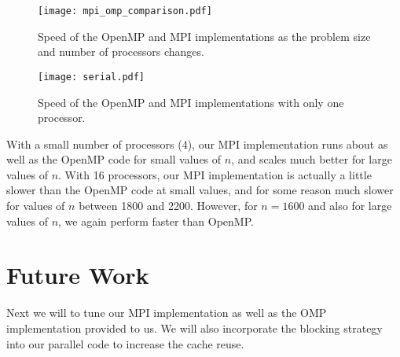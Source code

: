 \documentclass[11pt]{article}
\begin{document}
\begin{figure}[h]
	\centering
	\texttt{[image: mpi\_omp\_comparison.pdf]}
	\caption{Speed of the OpenMP and MPI implementations as the problem size and number of processors changes.}
	\label{fig:mpi-omp}
\end{figure}

\begin{figure}[h]
	\centering
	\texttt{[image: serial.pdf]}
	\caption{Speed of the OpenMP and MPI implementations with only one processor.}
	\label{fig:serial}
\end{figure}

With a small number of processors (4), our MPI implementation runs about as well as the OpenMP code for small values of $n$, and scales much better for large values of $n$.
With 16 processors, our MPI implementation is actually a little slower than the OpenMP code at small values, and for some reason much slower for values of $n$ between 1800 and 2200.
However, for $n = 1600$ and also for large values of $n$, we again perform faster than OpenMP.


\section{Future Work}
Next we will to tune our MPI implementation as well as the OMP implementation provided to us. We will also incorporate the blocking strategy into our parallel code to increase the cache reuse.
\end{document}
